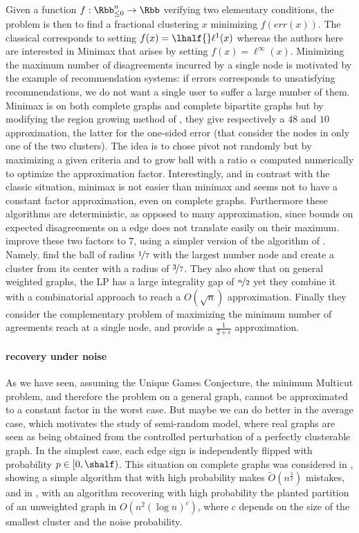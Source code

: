 Given a function $f: \Rbb^n_{\leq 0} \rightarrow \Rbb$ verifying two elementary conditions, the
problem is then to find a fractional clustering $x$ minimizing $f(err(x))$. The classical \pcc{}
corresponds to setting $f(x) = \lhalf{}\ell^1(x)$ whereas the authors here are interested in Minimax
\pcc{} that arises by setting $f(x) = \ell^\infty(x)$. Minimizing the maximum number of
disagreements incurred by a single node is motivated by the example of recommendation systems: if
errors corresponds to unsatisfying recommendations, we do not want a single user to suffer a large
number of them. Minimax \pcc{} is \NPc{} on both complete graphs and complete bipartite graphs but
by modifying the region growing method of \textcite{Charikar2003}, they give respectively a $48$ and
$10$ approximation, the latter for the one-sided error (that consider the nodes in only one of the
two clusters). The idea is to chose pivot not randomly but by maximizing a given criteria and
to grow ball with a ratio $\alpha$ computed numerically to optimize the approximation factor.
Interestingly, and in contrast with the classic \pcc{} situation, minimax \maxa{} is not easier than
minimax \mind{} and seems not to have a constant factor approximation, even on complete graphs.
Furthermore these algorithms are deterministic, as opposed to many \pcc{} approximation, since
bounds on expected disagreements on a edge does not translate easily on their maximum.
\Textcite{Charikar2017} improve these two factors to $7$, using a simpler version of the algorithm
of \textcite{pmlr-v48-puleo16}. Namely, find the ball of radius $\nicefrac{1}{7}$ with the largest
number node and create a cluster from its center with a radius of $\nicefrac{3}{7}$. They also show
that on general weighted graphs, the LP has a large integrality gap of $\nicefrac{n}{2}$ yet they
combine it with a combinatorial approach to reach a $O(\sqrt{n})$ approximation. Finally they
consider the complementary problem of maximizing the minimum number of agreements reach at a single
node, and provide a $\frac{1}{2+\epsilon}$ approximation.


\paragraph{recovery under noise}

As we have seen, assuming the Unique Games Conjecture, the minimum Multicut problem, and therefore
the \pcc{} problem on a general graph, cannot be approximated to a constant factor in the worst
case.  But maybe we can do better in the average case, which motivates the study of semi-random
model, where real graphs are seen as being obtained from the controlled perturbation of a perfectly
clusterable graph. In the simplest case, each edge sign is independently flipped with probability
$p \in [0, \shalf)$. This situation on complete graphs was considered in \autocite[Section
6]{Bansal2002}, showing a simple algorithm that with high probability makes
$\tilde{O}(n^\frac{3}{2})$ mistakes, and in \autocite[Theorem 2.6]{Ben-Dor99}, with an algorithm
recovering with high probability the planted partition of an unweighted graph in $O(n^2(\log n)^c)$,
where $c$ depends on the size of the smallest cluster and the noise probability.

